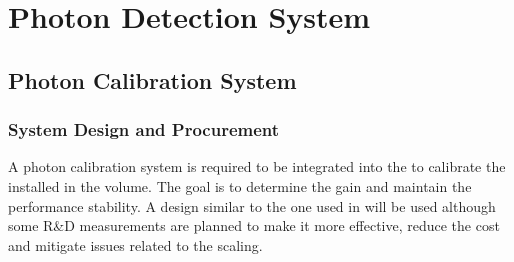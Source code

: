 \chapter{Photon Detection System}
\label{ch:fddp-pd}


\section{Photon Calibration System}
\label{sec:fddp-pd-5}

\subsection{System Design and Procurement}
\label{sec:fddp-pd-5.1}

A photon calibration system is required to be integrated into the  to calibrate the  
installed in the \lar volume. The goal is to determine the  gain and maintain the  performance stability. A design similar to the one used in  will be used although some R\&D measurements are planned to make it more effective, reduce the cost and mitigate issues related to the scaling.

